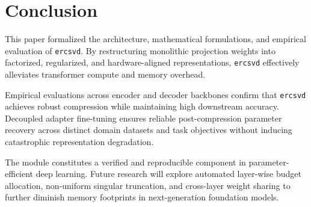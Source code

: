\section{Conclusion}
This paper formalized the architecture, mathematical formulations, and empirical evaluation of \texttt{ercsvd}. By restructuring monolithic projection weights into factorized, regularized, and hardware-aligned representations, \texttt{ercsvd} effectively alleviates transformer compute and memory overhead.

Empirical evaluations across encoder and decoder backbones confirm that \texttt{ercsvd} achieves robust compression while maintaining high downstream accuracy. Decoupled adapter fine-tuning ensures reliable post-compression parameter recovery across distinct domain datasets and task objectives without inducing catastrophic representation degradation.

The module constitutes a verified and reproducible component in parameter-efficient deep learning. Future research will explore automated layer-wise budget allocation, non-uniform singular truncation, and cross-layer weight sharing to further diminish memory footprints in next-generation foundation models.
